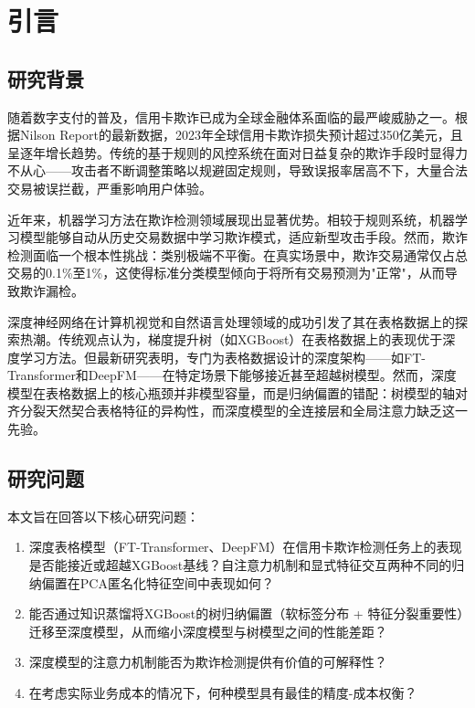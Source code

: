 
\section{引言}

\subsection{研究背景}

随着数字支付的普及，信用卡欺诈已成为全球金融体系面临的最严峻威胁之一。根据Nilson Report的最新数据，2023年全球信用卡欺诈损失预计超过350亿美元，且呈逐年增长趋势。传统的基于规则的风控系统在面对日益复杂的欺诈手段时显得力不从心——攻击者不断调整策略以规避固定规则，导致误报率居高不下，大量合法交易被误拦截，严重影响用户体验。

近年来，机器学习方法在欺诈检测领域展现出显著优势。相较于规则系统，机器学习模型能够自动从历史交易数据中学习欺诈模式，适应新型攻击手段。然而，欺诈检测面临一个根本性挑战：类别极端不平衡。在真实场景中，欺诈交易通常仅占总交易的0.1\%至1\%，这使得标准分类模型倾向于将所有交易预测为"正常"，从而导致欺诈漏检。

深度神经网络在计算机视觉和自然语言处理领域的成功引发了其在表格数据上的探索热潮。传统观点认为，梯度提升树（如XGBoost）在表格数据上的表现优于深度学习方法。但最新研究表明，专门为表格数据设计的深度架构——如FT-Transformer和DeepFM——在特定场景下能够接近甚至超越树模型。然而，深度模型在表格数据上的核心瓶颈并非模型容量，而是归纳偏置的错配：树模型的轴对齐分裂天然契合表格特征的异构性，而深度模型的全连接层和全局注意力缺乏这一先验。

\subsection{研究问题}

本文旨在回答以下核心研究问题：

\begin{enumerate}
    \item 深度表格模型（FT-Transformer、DeepFM）在信用卡欺诈检测任务上的表现是否能接近或超越XGBoost基线？自注意力机制和显式特征交互两种不同的归纳偏置在PCA匿名化特征空间中表现如何？
    \item 能否通过知识蒸馏将XGBoost的树归纳偏置（软标签分布 + 特征分裂重要性）迁移至深度模型，从而缩小深度模型与树模型之间的性能差距？
    \item 深度模型的注意力机制能否为欺诈检测提供有价值的可解释性？
    \item 在考虑实际业务成本的情况下，何种模型具有最佳的精度-成本权衡？
\end{enumerate}

